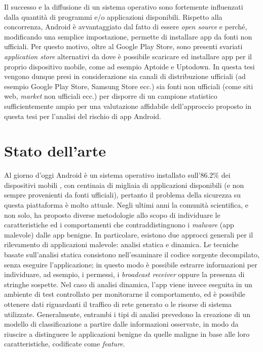 \documentclass[12pt,a4paper,oneside]{article}
\begin{document}
Il successo e la diffusione di un sistema operativo sono fortemente influenzati dalla quantità di programmi e/o applicazioni disponibili. Rispetto alla concorrenza, Android è avvantaggiato dal fatto di essere \textit{open source} e perché, modificando una semplice impostazione, permette di installare app da fonti non ufficiali. Per questo motivo, oltre al Google Play Store, sono presenti svariati \textit{application store} alternativi da dove è possibile scaricare ed installare app per il proprio dispositivo mobile, come ad esempio Aptoide e Uptodown. In questa tesi vengono dunque presi in considerazione sia canali di distribuzione ufficiali (ad esempio Google Play Store, Samsung Store ecc.) sia fonti non ufficiali (come siti web, \textit{market} non ufficiali ecc.) per disporre di un campione statistico sufficientemente ampio per una valutazione affidabile dell'approccio proposto in questa tesi per l'analisi del rischio di app Android.
\newpage





\section{Stato dell'arte}\label{sec:Stato_arte}

Al giorno d'oggi Android è un sistema operativo installato sull'$86.2\%$ dei dispositivi mobili \cite{GARTNER}, con centinaia di migliaia di applicazioni disponibili (e non sempre provenienti da fonti ufficiali), pertanto il problema della sicurezza su questa piattaforma è molto attuale. Negli ultimi anni la comunità scientifica, e non solo, ha proposto diverse metodologie allo scopo di individuare le caratteristiche ed i comportamenti che contraddistinguono i \textit{malware} (app malevole) dalle app benigne. In particolare, esistono due approcci generali per il rilevamento di applicazioni malevole: analisi statica e dinamica. Le tecniche basate sull'analisi statica consistono nell'esaminare il codice sorgente decompilato, senza eseguire l'applicazione; in questo modo è possibile estrarre informazioni per individuare, ad esempio, i permessi, i \textit{broadcast receiver} oppure la presenza di stringhe sospette. Nel caso di analisi dinamica, l'app viene invece eseguita in un ambiente di test controllato per monitorarne il comportamento, ed è possibile ottenere dati riguardanti il traffico di rete generato o le risorse di sistema utilizzate. Generalmente, entrambi i tipi di analisi prevedono la creazione di un modello di classificazione a partire dalle informazioni osservate, in modo da riuscire a distinguere le applicazioni benigne da quelle maligne in base alle loro caratteristiche, codificate come \textit{feature}.
\end{document}
